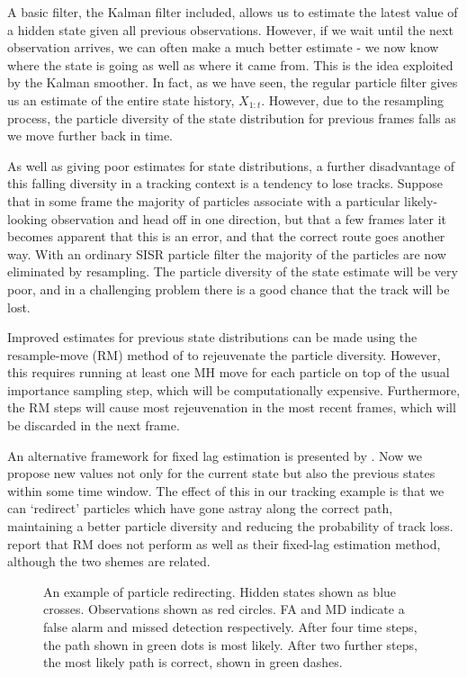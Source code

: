 A basic filter, the Kalman filter included, allows us to estimate the latest value of a hidden state given all previous observations. However, if we wait until the next observation arrives, we can often make a much better estimate - we now know where the state is going as well as where it came from. This is the idea exploited by the Kalman smoother. In fact, as we have seen, the regular particle filter gives us an estimate of the entire state history, $X_{1:t}$. However, due to the resampling process, the particle diversity of the state distribution for previous frames falls as we move further back in time.

As well as giving poor estimates for state distributions, a further disadvantage of this falling diversity in a tracking context is a tendency to lose tracks. Suppose that in some frame the majority of particles associate with a particular likely-looking observation and head off in one direction, but that a few frames later it becomes apparent that this is an error, and that the correct route goes another way. With an ordinary SISR particle filter the majority of the particles are now eliminated by resampling. The particle diversity of the state estimate will be very poor, and in a challenging problem there is a good chance that the track will be lost.

Improved estimates for previous state distributions can be made using the resample-move (RM) method of \cite{Gilks2001} to rejeuvenate the particle diversity. However, this requires running at least one MH move for each particle on top of the usual importance sampling step, which will be computationally expensive. Furthermore, the RM steps will cause most rejeuvenation in the most recent frames, which will be discarded in the next frame.

An alternative framework for fixed lag estimation is presented by \cite{Doucet2006}. Now we propose new values not only for the current state but also the previous states within some time window. The effect of this in our tracking example is that we can `redirect' particles which have gone astray along the correct path, maintaining a better particle diversity and reducing the probability of track loss. \cite{Doucet2006} report that RM does not perform as well as their fixed-lag estimation method, although the two shemes are related.

\begin{figure} \centering
%
\caption{An example of particle redirecting. Hidden states shown as blue crosses. Observations shown as red circles. FA and MD indicate a false alarm and missed detection respectively. After four time steps, the path shown in green dots is most likely. After two further steps, the most likely path is correct, shown in green dashes.}
\label{fig:BasicTrackingAssoc}%
\end{figure}